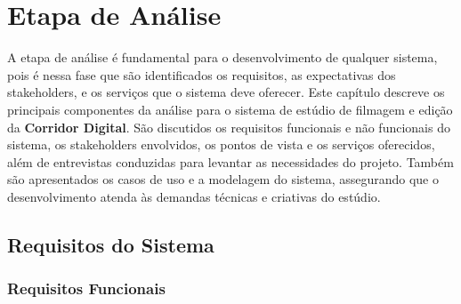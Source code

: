 
\chapter{Etapa de Análise}

A etapa de análise é fundamental para o desenvolvimento de qualquer sistema, pois é nessa fase que são identificados os requisitos, as expectativas dos stakeholders, e os serviços que o sistema deve oferecer. Este capítulo descreve os principais componentes da análise para o sistema de estúdio de filmagem e edição da \textbf{Corridor Digital}. São discutidos os requisitos funcionais e não funcionais do sistema, os stakeholders envolvidos, os pontos de vista e os serviços oferecidos, além de entrevistas conduzidas para levantar as necessidades do projeto. Também são apresentados os casos de uso e a modelagem do sistema, assegurando que o desenvolvimento atenda às demandas técnicas e criativas do estúdio.

\section{Requisitos do Sistema}



\subsection{Requisitos Funcionais}

